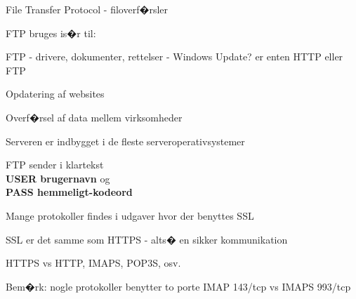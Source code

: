 \documentclass[20pt,landscape,a4paper,footrule]{foils}
\begin{document}






\begin{list1}
\item File Transfer Protocol - filoverf�rsler
\item FTP bruges is�r til:
  \begin{list2}
    \item FTP - drivere, dokumenter, rettelser - Windows Update? er
    enten HTTP eller FTP
\item Opdatering af websites
\item Overf�rsel af data mellem virksomheder
\item Serveren er indbygget i de fleste serveroperativsystemer
  \end{list2}
\item FTP sender i klartekst\\
{\bfseries USER brugernavn} og \\
{\bfseries PASS hemmeligt-kodeord}
\end{list1}


\begin{list1}
\item Mange protokoller findes i udgaver hvor der benyttes SSL
\item SSL er det samme som HTTPS - alts� en sikker kommunikation
\item HTTPS vs HTTP, IMAPS, POP3S, osv.
\item Bem�rk: nogle protokoller benytter to porte IMAP 143/tcp vs IMAPS 993/tcp
\end{list1}


\centerline{}







\centerline{}
\end{document}
